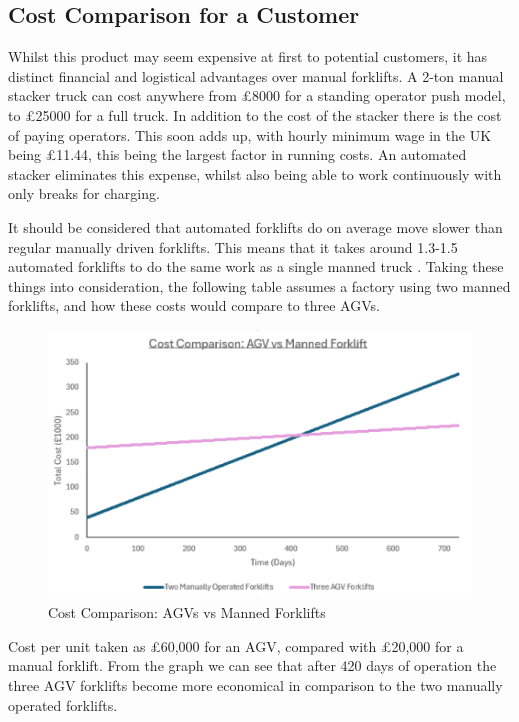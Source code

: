 \documentclass[12pt]{article}
\begin{document}
\subsection{Cost Comparison for a Customer}
Whilst this product may seem expensive at first to potential customers, it has distinct financial and logistical advantages over manual forklifts. A 2-ton manual stacker truck can cost anywhere from £8000 for a standing operator push model, to £25000 for a full truck. In addition to the cost of the stacker there is the cost of paying operators. 
This soon adds up, with hourly minimum wage in the UK being £11.44, this being the largest factor in running costs. An automated stacker eliminates this expense, whilst also being able to work continuously with only breaks for charging.

It should be considered that automated forklifts do on average move slower than regular manually driven forklifts. This means that it takes around 1.3-1.5 automated forklifts to do the same work as a single manned truck \cite{Pastor-Tella2024}. 
Taking these things into consideration, the following table assumes a factory using two manned forklifts, and how these costs would compare to three AGVs.
\begin{figure}[h!]
    \centering
     \includegraphics[width=1\textwidth]{CostComparisonGraphUpdatedV2.png}
        \caption{Cost Comparison: AGVs vs Manned Forklifts}
         \label{fig:timeline}
\end{figure}
\FloatBarrier
Cost per unit taken as £60,000 for an AGV, compared with £20,000 for a manual forklift. From the graph we can see that after 420 days of operation the three AGV forklifts become more economical in comparison to the two manually operated forklifts.
\end{document}
